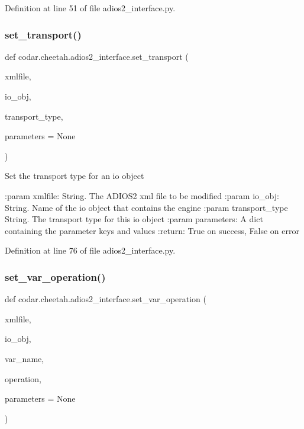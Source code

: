 Definition at line 51 of file adios2\+\_\+interface.\+py.

\mbox{\label{namespacecodar_1_1cheetah_1_1adios2__interface_a280110df154228afd07dcb5c5a4a72d4}} 
\subsubsection{\texorpdfstring{set\+\_\+transport()}{set\_transport()}}
{\footnotesize\ttfamily def codar.\+cheetah.\+adios2\+\_\+interface.\+set\+\_\+transport (\begin{DoxyParamCaption}\item[{}]{xmlfile,  }\item[{}]{io\+\_\+obj,  }\item[{}]{transport\+\_\+type,  }\item[{}]{parameters = {\ttfamily None} }\end{DoxyParamCaption})}

\begin{DoxyVerb}Set the transport type for an io object

:param xmlfile: String. The ADIOS2 xml file to be modified
:param io_obj: String. Name of the io object that contains the engine
:param transport_type String. The transport type for this io object
:param parameters: A dict containing the parameter keys and values
:return: True on success, False on error
\end{DoxyVerb}
 

Definition at line 76 of file adios2\+\_\+interface.\+py.

\mbox{\label{namespacecodar_1_1cheetah_1_1adios2__interface_a7bfeac0db728f4fcfd42c176d18e1a20}} 
\subsubsection{\texorpdfstring{set\+\_\+var\+\_\+operation()}{set\_var\_operation()}}
{\footnotesize\ttfamily def codar.\+cheetah.\+adios2\+\_\+interface.\+set\+\_\+var\+\_\+operation (\begin{DoxyParamCaption}\item[{}]{xmlfile,  }\item[{}]{io\+\_\+obj,  }\item[{}]{var\+\_\+name,  }\item[{}]{operation,  }\item[{}]{parameters = {\ttfamily None} }\end{DoxyParamCaption})}

